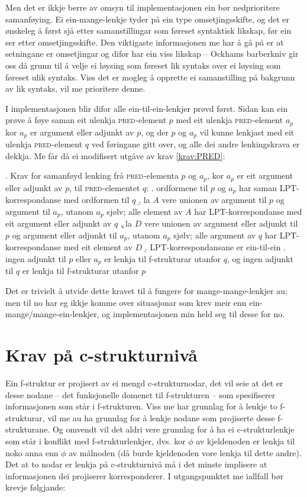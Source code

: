 \documentclass[12pt,a4paper,oneside,draft]{report}
\newcommand{\F}[2]{\textsc{#1}\ensuremath{_{#2}}}
\newcommand{\PRED}{\F{pred}{}}
\begin{document}
Men det er ikkje berre av omsyn til implementasjonen ein bør
 nedprioritere samanføying. Ei ein-mange-lenkje tyder på ein type
 omsetjingsskifte, og det er ønskeleg å først sjå etter
 samanstillingar som føreset syntaktisk likskap, før ein ser etter
 omsetjingsskifte. Den viktigaste informasjonen me har å gå på er at
 setningane er omsetjingar og difor har ein viss likskap -- Ockhams
 barberkniv gir oss då grunn til å velje ei løysing som føreset lik
 syntaks over ei løysing som føreset ulik syntaks. Viss det er mogleg
 å opprette ei samanstilling på bakgrunn av lik syntaks, vil me
 prioritere denne.

I implementasjonen blir difor alle ein-til-ein-lenkjer prøvd
 først. Sidan kan ein prøve å føye saman eit ulenkja \PRED{}-element
 $p$ med eit ulenkja \PRED{}-element $a_p$ kor $a_p$ er argument eller
 adjunkt av $p$, og der $p$ og $a_p$ vil kunne lenkjast med eit
 ulenkja \PRED{}-element $q$ ved føringane gitt over, og alle dei
 andre lenkingskrava er dekkja. Me får då ei modifisert utgåve av
 krav \ref{krav:PRED}:

\ex. \label{krav:f-ein-mange} Krav for samanføyd lenking frå \PRED{}-elementa
$p$ og $a_p$, kor $a_p$ er eit argument eller adjunkt av $p$, til \PRED{}-elementet $q$:
\a. ordformene til $p$ og $a_p$ har saman LPT\hyp{}korrespondanse med ordformen til $q$
\b. la $A$ vere unionen av argument til $p$ og argument til $a_p$,
    utanom $a_p$ sjølv;
    alle element av $A$ har LPT\hyp{}korrespondanse med eit argument eller adjunkt av $q$
\c. la $D$ vere unionen av argument eller adjunkt til $p$ og argument
    eller adjunkt til $a_p$, utanom $a_p$ sjølv;
    alle argument av $q$ har LPT\hyp{}korrespondanse med eit element av $D$
\d. LPT\hyp{}korrespondansane er ein-til-ein
\e. ingen adjunkt til $p$ eller $a_p$ er lenkja til f\hyp{}strukturar utanfor $q$, og ingen
    adjunkt til $q$ er lenkja til f\hyp{}strukturar utanfor $p$

Det er trivielt å utvide dette kravet til å fungere for
mange-mange-lenkjer au; men til no har eg ikkje komme over situasjonar
som krev meir enn ein-mange/mange-ein-lenkjer, og implementasjonen min
held seg til desse for no.

\section{Krav på c\hyp{}strukturnivå}
\label{sec-3.7}

\label{SEC:subnode}

Ein f\hyp{}struktur er projisert av ei mengd c\hyp{}strukturnodar, det
 vil seie at det er desse nodane -- det funksjonelle domenet til
 f\hyp{}strukturen -- som spesifiserer informasjonen som står i
 f\hyp{}strukturen. Viss me har grunnlag for å lenkje to
 f\hyp{}strukturar, vil me au ha grunnlag for å lenkje nodane som
 projiserte desse f\hyp{}strukturane. Og omvendt vil det aldri vere
 grunnlag for å ha ei c\hyp{}strukturlenkje som står i konflikt med
 f\hyp{}strukturlenkjer, dvs. kor $\phi$ av kjeldenoden er lenkja til
 noko anna enn $\phi$ av målnoden (då burde kjeldenoden vore lenkja
 til dette andre). Det at to nodar er lenkja på c\hyp{}strukturnivå må
 i det minste implisere at informasjonen dei projiserer
 korresponderer. I utgangspunktet me iallfall bør krevje følgjande:
\end{document}
